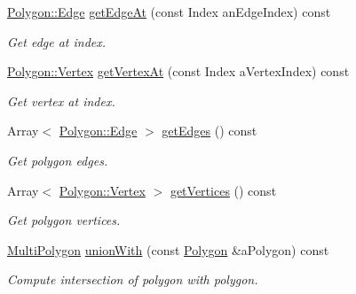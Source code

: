 \begin{DoxyCompactItemize}
\hyperlink{classlibrary_1_1math_1_1geom_1_1d2_1_1objects_1_1_polygon_a17e3083d71685e16f3244298e6f44ad9}{Polygon\+::\+Edge} \hyperlink{classlibrary_1_1math_1_1geom_1_1d2_1_1objects_1_1_polygon_a92d93fe3b0f2d2b17b393475f3e1c090}{get\+Edge\+At} (const Index an\+Edge\+Index) const
\begin{DoxyCompactList}\small\item\em Get edge at index. \end{DoxyCompactList}\item 
\hyperlink{classlibrary_1_1math_1_1geom_1_1d2_1_1objects_1_1_polygon_a1559cddbcb23d41f2be9e389b0ccd127}{Polygon\+::\+Vertex} \hyperlink{classlibrary_1_1math_1_1geom_1_1d2_1_1objects_1_1_polygon_a3d592373be3ef2a722cfd70935f47832}{get\+Vertex\+At} (const Index a\+Vertex\+Index) const
\begin{DoxyCompactList}\small\item\em Get vertex at index. \end{DoxyCompactList}\item 
Array$<$ \hyperlink{classlibrary_1_1math_1_1geom_1_1d2_1_1objects_1_1_polygon_a17e3083d71685e16f3244298e6f44ad9}{Polygon\+::\+Edge} $>$ \hyperlink{classlibrary_1_1math_1_1geom_1_1d2_1_1objects_1_1_polygon_a22fbf3d4f9553311497d20b9495841a7}{get\+Edges} () const
\begin{DoxyCompactList}\small\item\em Get polygon edges. \end{DoxyCompactList}\item 
Array$<$ \hyperlink{classlibrary_1_1math_1_1geom_1_1d2_1_1objects_1_1_polygon_a1559cddbcb23d41f2be9e389b0ccd127}{Polygon\+::\+Vertex} $>$ \hyperlink{classlibrary_1_1math_1_1geom_1_1d2_1_1objects_1_1_polygon_ae73d59e0e0bb5d13bd69e2924e602e20}{get\+Vertices} () const
\begin{DoxyCompactList}\small\item\em Get polygon vertices. \end{DoxyCompactList}\item 
\hyperlink{classlibrary_1_1math_1_1geom_1_1d2_1_1objects_1_1_multi_polygon}{Multi\+Polygon} \hyperlink{classlibrary_1_1math_1_1geom_1_1d2_1_1objects_1_1_polygon_a813f6b937bddcefd06701200adbb8a5f}{union\+With} (const \hyperlink{classlibrary_1_1math_1_1geom_1_1d2_1_1objects_1_1_polygon}{Polygon} \&a\+Polygon) const
\begin{DoxyCompactList}\small\item\em Compute intersection of polygon with polygon. \end{DoxyCompactList}\item 

\end{DoxyCompactItemize}
